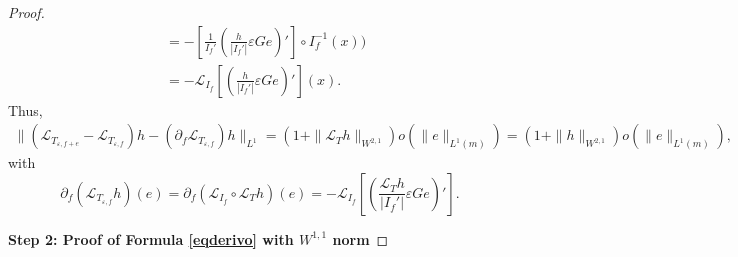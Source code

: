 \documentclass[12pt]{article}
\def\L{\mathcal{L}}
\newcommand{\eps}{\varepsilon}
\theoremstyle{plain}
\begin{document}
{\begin{proof}
\begin{align}
&=-\left[\frac{1}{I_f'}\left(\frac{h}{|I_{f}'|} \eps G e\right)'\right]\circ I_f^{-1}(x))\nonumber\\
&=-\L_{I_f}\left[\left(\frac{h}{|I_{f}'|} \eps G e\right)'\right](x).\label{eqderivif}
\end{align}
Thus,
\begin{align*}
    \|(\L_{T_{\eps, f+e}}-\L_{T_{\eps, f}})h-(\partial_f\L_{T_{\eps, f}})h\|_{L^1}=(1+\|\mathcal{L}_Th\|_{W^{2,1}})o(\|e\|_{L^{1}(m)})=(1+\|h\|_{W^{2,1}})o(\|e\|_{L^{1}(m)}),
\end{align*}
with 
\begin{equation}
    \label{Tepsderiv}
\partial_f(\L_{T_{\eps, f}}h)(e)=\partial_f(\L_{I_{f}}\circ\L_Th)(e)=-\L_{I_f}\left[\left(\frac{\L_{T}h}{|I_{f}'|} \eps G e\right)'\right].
\end{equation}


\textbf{Step 2: Proof of Formula \eqref{eqderivo} with $W^{1,1}$ norm}


\end{proof}}
\end{document}
